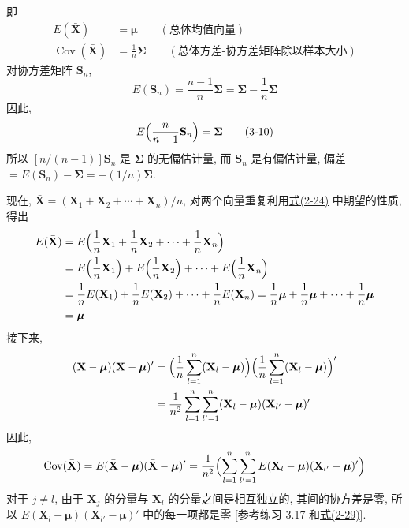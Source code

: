 
即
\label{eq:3-9}
\begin{equation}
\begin{aligned}
E(\bar{\mathbf{X}})&=\boldsymbol{\mu}\qquad(\text{总体均值向量})\\[4pt]
\operatorname{Cov}(\bar{\mathbf{X}})&=\frac{1}{n}\boldsymbol{\Sigma}\qquad(\text{总体方差-协方差矩阵除以样本大小})
\end{aligned}
\tag{3-9}
\end{equation}
对协方差矩阵 $\mathbf{S}_{n}$,
\[
E(\mathbf{S}_{n})=\frac{n-1}{n}\boldsymbol{\Sigma}=\boldsymbol{\Sigma}-\frac{1}{n}\boldsymbol{\Sigma}
\]
因此,
\label{eq:3-10}
\begin{equation}
E\Bigl(\frac{n}{n-1}\mathbf{S}_{n}\Bigr)=\boldsymbol{\Sigma}
\tag{3-10}
\end{equation}
所以 $[n/(n-1)]\mathbf{S}_{n}$ 是 $\boldsymbol{\Sigma}$ 的无偏估计量, 而 $\mathbf{S}_{n}$ 是有偏估计量, 偏差 $=E(\mathbf{S}_{n})-\boldsymbol{\Sigma}=-(1/n)\boldsymbol{\Sigma}$.

\medskip
\noindent{}\quad 现在, $\bar{\mathbf{X}}=(\mathbf{X}_{1}+\mathbf{X}_{2}+\cdots+\mathbf{X}_{n})/n$, 对两个向量重复利用\hyperref[eq:2-24]{式(2-24)} 中期望的性质, 得出
\begin{align*}
E(\bar{\mathbf{X}})&=E\Bigl(\frac{1}{n}\mathbf{X}_{1}+\frac{1}{n}\mathbf{X}_{2}+\cdots+\frac{1}{n}\mathbf{X}_{n}\Bigr)\\
&=E\Bigl(\frac{1}{n}\mathbf{X}_{1}\Bigr)+E\Bigl(\frac{1}{n}\mathbf{X}_{2}\Bigr)+\cdots+E\Bigl(\frac{1}{n}\mathbf{X}_{n}\Bigr)\\
&=\frac{1}{n}E(\mathbf{X}_{1})+\frac{1}{n}E(\mathbf{X}_{2})+\cdots+\frac{1}{n}E(\mathbf{X}_{n})=\frac{1}{n}\boldsymbol{\mu}+\frac{1}{n}\boldsymbol{\mu}+\cdots+\frac{1}{n}\boldsymbol{\mu}\\
&=\boldsymbol{\mu}
\end{align*}
接下来,
\begin{align*}
(\bar{\mathbf{X}}-\boldsymbol{\mu})(\bar{\mathbf{X}}-\boldsymbol{\mu})'
&=\Bigl(\frac{1}{n}\sum_{l=1}^{n}(\mathbf{X}_{l}-\boldsymbol{\mu})\Bigr)\Bigl(\frac{1}{n}\sum_{l=1}^{n}(\mathbf{X}_{l}-\boldsymbol{\mu})\Bigr)'\\
&=\frac{1}{n^{2}}\sum_{l=1}^{n}\sum_{l'=1}^{n}(\mathbf{X}_{l}-\boldsymbol{\mu})(\mathbf{X}_{l'}-\boldsymbol{\mu})'
\end{align*}
因此,
\[
\operatorname{Cov}(\bar{\mathbf{X}})=E(\bar{\mathbf{X}}-\boldsymbol{\mu})(\bar{\mathbf{X}}-\boldsymbol{\mu})'
=\frac{1}{n^{2}}\Bigl(\sum_{l=1}^{n}\sum_{l'=1}^{n}E(\mathbf{X}_{l}-\boldsymbol{\mu})(\mathbf{X}_{l'}-\boldsymbol{\mu})'\Bigr)
\]
对于 $j\ne l$, 由于 $\mathbf{X}_{j}$ 的分量与 $\mathbf{X}_{l}$ 的分量之间是相互独立的, 其间的协方差是零, 所以 $E(\mathbf{X}_{l}-\boldsymbol{\mu})(\mathbf{X}_{l'}-\boldsymbol{\mu})'$ 中的每一项都是零 [参考练习 3.17 和\hyperref[eq:2-29]{式(2-29)}].

